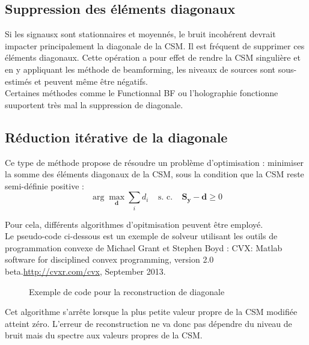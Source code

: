 \subsection{Suppression des éléments diagonaux}
Si les signausx sont stationnaires et moyennés, le bruit incohérent devrait impacter principalement la diagonale de la CSM. Il est fréquent de supprimer ces éléments diagonaux. Cette opération a pour effet de rendre la CSM singulière et en y appliquant les méthode de beamforming, les niveaux de sources sont sous-estimés et peuvent même être négatifs.\\
Certaines méthodes comme le Functionnal BF  ou l'holographie fonctionne suuportent très mal la suppression de diagonale.

\subsection{Réduction itérative de la diagonale}
Ce type de méthode propose de résoudre un problème d'optimisation : minimiser la somme des éléments diagonaux de la CSM, sous la condition que la CSM reste semi-définie positive : 
\begin{equation}
    \arg\max_{\bm{d}}\sum_i d_i~~~~~\text{s. c.}~~~~~\bm{S_y}-\bm{d}\geq 0
\end{equation}

Pour cela, différents algorithmes d'opitmisation peuvent être employé.\\
Le pseudo-code ci-dessous est un exemple de solveur utilisant les outils de programmation convexe de Michael Grant et Stephen Boyd : CVX: Matlab software for disciplined convex programming, version 2.0 beta.\url{http://cvxr.com/cvx}, September 2013.

\begin{figure}[!h]
	\centering
	\caption{Exemple de code pour la reconstruction de diagonale}
\end{figure}
Cet algorithme s'arrête lorsque la plus petite valeur propre de la CSM modifiée atteint zéro. L'erreur de reconstruction ne va donc pas dépendre du niveau de bruit mais du spectre aux valeurs propres de la CSM. \\
~\\

